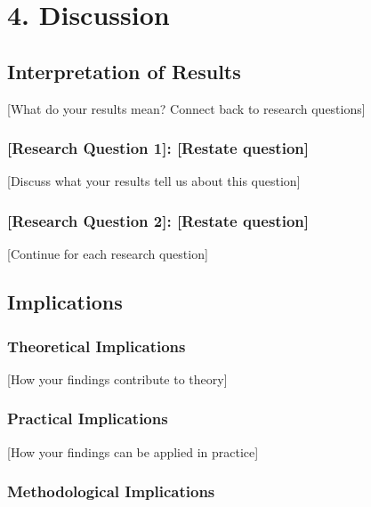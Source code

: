 \documentclass[
]{article}
\begin{document}
\section{4. Discussion}\label{discussion}

\subsection{Interpretation of Results}\label{interpretation-of-results}

{[}What do your results mean? Connect back to research questions{]}

\subsubsection{{[}Research Question 1{]}: {[}Restate
question{]}}\label{research-question-1-restate-question}

{[}Discuss what your results tell us about this question{]}

\subsubsection{{[}Research Question 2{]}: {[}Restate
question{]}}\label{research-question-2-restate-question}

{[}Continue for each research question{]}

\subsection{Implications}\label{implications}

\subsubsection{Theoretical Implications}\label{theoretical-implications}

{[}How your findings contribute to theory{]}

\subsubsection{Practical Implications}\label{practical-implications}

{[}How your findings can be applied in practice{]}

\subsubsection{Methodological
Implications}\label{methodological-implications}
\end{document}
